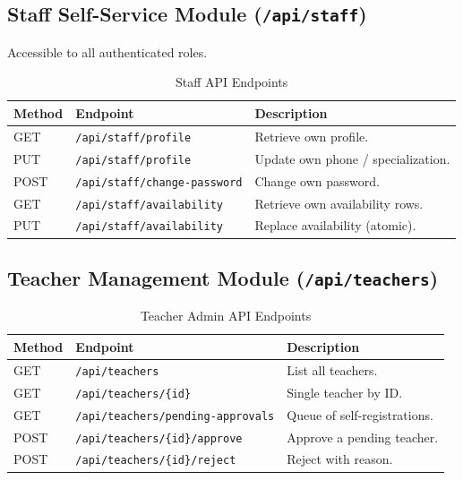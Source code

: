 \subsection{Staff Self-Service Module (\texttt{/api/staff})}
Accessible to all authenticated roles.
\begin{table}[H]
    \centering
    \renewcommand{\arraystretch}{1.4}
    \begin{tabular}{|p{1.8cm}|p{5.3cm}|p{6.5cm}|}
        \hline
        \textbf{Method} & \textbf{Endpoint} & \textbf{Description} \\
        \hline
        GET & \texttt{/api/staff/profile} & Retrieve own profile. \\
        \hline
        PUT & \texttt{/api/staff/profile} & Update own phone / specialization. \\
        \hline
        POST & \texttt{/api/staff/change-password} & Change own password. \\
        \hline
        GET & \texttt{/api/staff/availability} & Retrieve own availability rows. \\
        \hline
        PUT & \texttt{/api/staff/availability} & Replace availability (atomic). \\
        \hline
    \end{tabular}
    \caption{Staff API Endpoints}
    \label{tab:api_staff}
\end{table}

\subsection{Teacher Management Module (\texttt{/api/teachers})}
\begin{table}[H]
    \centering
    \renewcommand{\arraystretch}{1.4}
    \begin{tabular}{|p{1.8cm}|p{5.3cm}|p{6.5cm}|}
        \hline
        \textbf{Method} & \textbf{Endpoint} & \textbf{Description} \\
        \hline
        GET & \texttt{/api/teachers} & List all teachers. \\
        \hline
        GET & \texttt{/api/teachers/\{id\}} & Single teacher by ID. \\
        \hline
        GET & \texttt{/api/teachers/pending-approvals} & Queue of self-registrations. \\
        \hline
        POST & \texttt{/api/teachers/\{id\}/approve} & Approve a pending teacher. \\
        \hline
        POST & \texttt{/api/teachers/\{id\}/reject} & Reject with reason. \\
        \hline
    \end{tabular}
    \caption{Teacher Admin API Endpoints}
    \label{tab:api_teacher}
\end{table}

